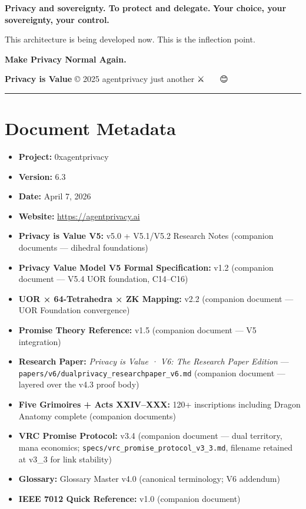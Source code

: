 \documentclass[
]{article}
\begin{document}
\textbf{Privacy and sovereignty. To protect and delegate.} \textbf{Your
choice, your sovereignty, your control.}

This architecture is being developed now. This is the inflection point.

\textbf{Make Privacy Normal Again.}

\textbf{Privacy is Value} © 2025 agentprivacy just another ⚔️ 🧙‍♂️ 🤖 😊

\begin{center}\rule{0.5\linewidth}{0.5pt}\end{center}

\section{Document Metadata}\label{document-metadata}

\begin{itemize}
\item
  \textbf{Project:} 0xagentprivacy
\item
  \textbf{Version:} 6.3
\item
  \textbf{Date:} April 7, 2026
\item
  \textbf{Website:} \url{https://agentprivacy.ai}
\item
  \textbf{Privacy is Value V5:} v5.0 + V5.1/V5.2 Research Notes
  (companion documents --- dihedral foundations)
\item
  \textbf{Privacy Value Model V5 Formal Specification:} v1.2 (companion
  document --- V5.4 UOR foundation, C14--C16)
\item
  \textbf{UOR × 64-Tetrahedra × ZK Mapping:} v2.2 (companion document
  --- UOR Foundation convergence)
\item
  \textbf{Promise Theory Reference:} v1.5 (companion document --- V5
  integration)
\item
  \textbf{Research Paper:} \emph{Privacy is Value · V6: The Research
  Paper Edition} ---
  \texttt{papers/v6/dualprivacy\_researchpaper\_v6.md} (companion
  document --- layered over the v4.3 proof body)
\item
  \textbf{Five Grimoires + Acts XXIV--XXX:} 120+ inscriptions including
  Dragon Anatomy complete (companion documents)
\item
  \textbf{VRC Promise Protocol:} v3.4 (companion document --- dual
  territory, mana economics;
  \texttt{specs/vrc\_promise\_protocol\_v3\_3.md}, filename retained at
  v3\_3 for link stability)
\item
  \textbf{Glossary:} Glossary Master v4.0 (canonical terminology; V6
  addendum)
\item
  \textbf{IEEE 7012 Quick Reference:} v1.0 (companion document)
\end{itemize}
\end{document}
